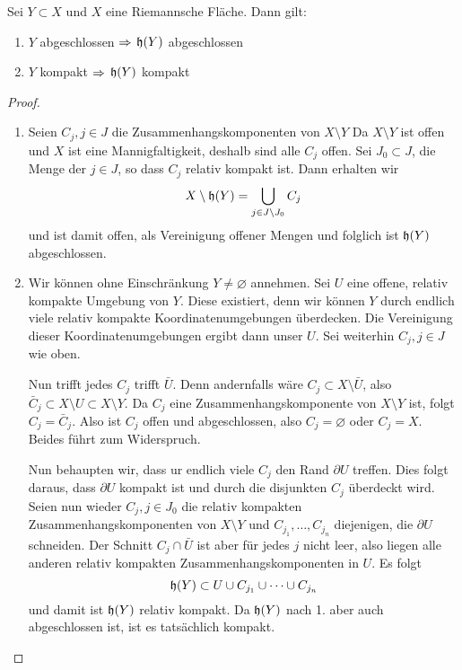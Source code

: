 \begin{thm}
  Sei $Y \subset X$ und $X$ eine Riemannsche Fläche. Dann gilt:
  \begin{enumerate}
  \item $Y$ abgeschlossen $\Rightarrow$ $\mathfrak{h}(Y)$ abgeschlossen
  \item $Y$ kompakt $\Rightarrow$ $\mathfrak{h}(Y)$ kompakt
  \end{enumerate}
\end{thm}

\begin{proof}
  \begin{enumerate}
  \item Seien $C_j, j \in J$ die Zusammenhangskomponenten von $X
    \setminus Y$ Da $X \setminus Y$ ist offen und $X$ ist eine
    Mannigfaltigkeit, deshalb sind alle $C_j$ offen. Sei $J_0 \subset
    J$, die Menge der $j \in J$, so dass $C_j$ relativ kompakt
    ist. Dann erhalten wir
    \[
    X \setminus \mathfrak{h}(Y) = \bigcup_{j \in J\setminus J_0} C_j
    \]
    und ist damit offen, als Vereinigung offener Mengen und folglich
    ist $\mathfrak{h}(Y)$ abgeschlossen.
  \item Wir können ohne Einschränkung $Y \neq \varnothing$
    annehmen. Sei $U$ eine offene, relativ kompakte Umgebung von
    $Y$. Diese existiert, denn wir können $Y$ durch endlich viele
    relativ kompakte Koordinatenumgebungen überdecken. Die Vereinigung
    dieser Koordinatenumgebungen ergibt dann unser $U$. Sei weiterhin
    $C_j, j\in J$ wie oben.

    Nun trifft jedes $C_j$ trifft $\bar U$. Denn andernfalls wäre $C_j
    \subset X \setminus \bar U$, also $\bar C_j
    \subset X \setminus U \subset X \setminus Y$. Da $C_j$ eine
    Zusammenhangskomponente von $X \setminus Y$ ist, folgt $C_j =
    \bar C_j$. Also ist $C_j$ offen und abgeschlossen, also $C_j =
    \varnothing$ oder $C_j = X$. Beides führt zum Widerspruch.

    Nun behaupten wir, dass ur endlich viele $C_j$ den Rand $\partial
    U$ treffen. 
    Dies folgt daraus, dass $\partial U$ kompakt ist und durch die
    disjunkten $C_j$ überdeckt wird.
    Seien nun wieder $C_j, j \in J_0$ die relativ kompakten
    Zusammenhangskomponenten von $X \setminus Y$ und $C_{j_1}, \dots,
    C_{j_n}$ diejenigen, die $\partial U$ schneiden. Der Schnitt $C_j
    \cap \bar U$ ist aber für jedes $j$ nicht leer, also liegen alle
    anderen relativ kompakten Zusammenhangskomponenten in
    $U$. Es folgt
    \[
    \mathfrak{h}(Y) \subset U \cup C_{j_1} \cup \dots \cup C_{j_n}
    \]
    und damit ist $\mathfrak{h}(Y)$ relativ kompakt. Da $\mathfrak{h}(Y)$ nach 1. aber auch
    abgeschlossen ist, ist es tatsächlich kompakt.
  \end{enumerate}
\end{proof}



